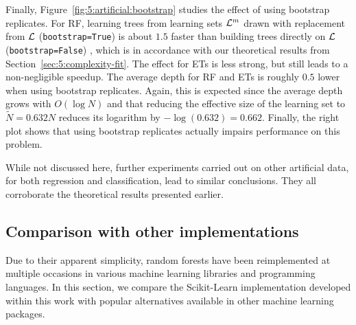 Finally, Figure~\ref{fig:5:artificial:bootstrap} studies the effect of using
bootstrap replicates. For RF, learning trees from learning sets ${\cal L}^m$
drawn with replacement from ${\cal L}$ (\texttt{bootstrap=True}) is about $1.5$ faster than building
trees directly on ${\cal L}$ (\texttt{bootstrap=False}) , which is in accordance with our theoretical
results from Section~\ref{sec:5:complexity-fit}. The effect for ETs is less
strong, but still leads to a non-negligible speedup. The average depth for RF
and ETs is roughly $0.5$ lower when using bootstrap replicates. Again, this is
expected since the average depth grows with $O(\log N)$ and that reducing the
effective size of the learning set to $\widetilde{N} = 0.632N$ reduces its
logarithm by $-\log(0.632) = 0.662$. Finally, the right plot shows that using
bootstrap replicates actually impairs performance on this problem.

While not discussed here, further experiments carried out on other artificial
data, for both regression and classification, lead to similar conclusions. They
all corroborate the theoretical results presented earlier.

\subsection{Comparison with other implementations}

Due to their apparent simplicity, random forests have been reimplemented at
multiple occasions in various machine learning libraries and programming
languages. In this section, we compare the Scikit-Learn implementation
developed within this work with popular alternatives available in other machine
learning packages.

